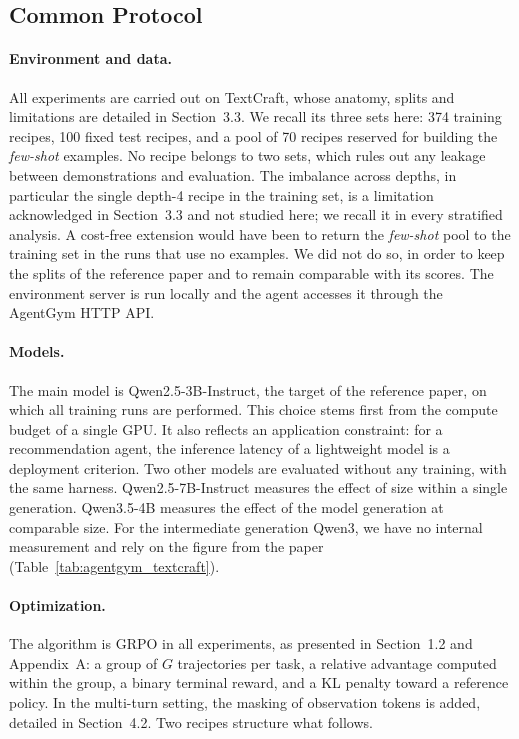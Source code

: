 \documentclass[11pt,a4paper]{article}
\begin{document}
\vspace{2cm}

\subsection{Common Protocol}\label{subsec:protocole}

\paragraph{Environment and data.} All experiments are carried out on TextCraft, whose anatomy, splits and limitations are detailed in Section~3.3. We recall its three sets here: 374 training recipes, 100 fixed test recipes, and a pool of 70 recipes reserved for building the \emph{few-shot} examples. No recipe belongs to two sets, which rules out any leakage between demonstrations and evaluation. The imbalance across depths, in particular the single depth-4 recipe in the training set, is a limitation acknowledged in Section~3.3 and not studied here; we recall it in every stratified analysis. A cost-free extension would have been to return the \emph{few-shot} pool to the training set in the runs that use no examples. We did not do so, in order to keep the splits of the reference paper and to remain comparable with its scores. The environment server is run locally and the agent accesses it through the AgentGym HTTP API.

\paragraph{Models.} The main model is Qwen2.5-3B-Instruct, the target of the reference paper, on which all training runs are performed. This choice stems first from the compute budget of a single GPU. It also reflects an application constraint: for a recommendation agent, the inference latency of a lightweight model is a deployment criterion. Two other models are evaluated without any training, with the same harness. Qwen2.5-7B-Instruct measures the effect of size within a single generation. Qwen3.5-4B measures the effect of the model generation at comparable size. For the intermediate generation Qwen3, we have no internal measurement and rely on the figure from the paper (Table~\ref{tab:agentgym_textcraft}). 



\paragraph{Optimization.} The algorithm is GRPO in all experiments, as presented in Section~1.2 and Appendix~A: a group of $G$ trajectories per task, a relative advantage computed within the group, a binary terminal reward, and a KL penalty toward a reference policy. In the multi-turn setting, the masking of observation tokens is added, detailed in Section~4.2. Two recipes structure what follows.
\end{document}
